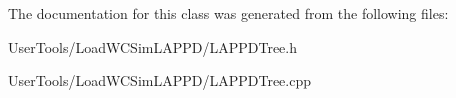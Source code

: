 The documentation for this class was generated from the following files:\begin{DoxyCompactItemize}
\item 
UserTools/LoadWCSimLAPPD/LAPPDTree.h\item 
UserTools/LoadWCSimLAPPD/LAPPDTree.cpp\end{DoxyCompactItemize}

